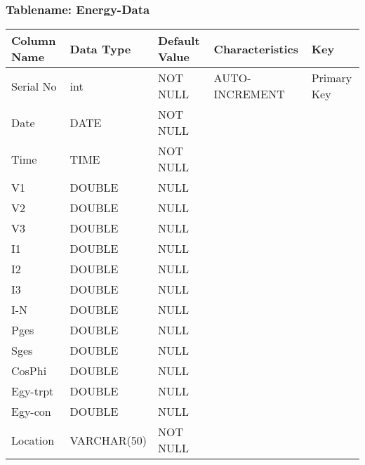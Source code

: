 \subsubsection*{Tablename:    Energy-Data} 
\begin{center}
    \begin{tabular}{ | l | l | l | l | l |}
    \hline
    \textbf{Column Name} & \textbf{Data Type} & \textbf{Default Value} & \textbf{Characteristics} & \textbf{Key} \\ \hline
    Serial No & int & NOT NULL & AUTO-INCREMENT & Primary Key\\ \hline
    Date & DATE & NOT NULL &  & \\ \hline
    Time & TIME & NOT NULL & & \\ \hline
    V1 & DOUBLE & NULL & & \\ \hline
    V2 & DOUBLE & NULL & & \\ \hline
    V3 & DOUBLE & NULL & & \\ \hline
    I1 & DOUBLE & NULL & & \\ \hline
    I2 & DOUBLE & NULL & & \\ \hline
    I3 & DOUBLE & NULL & & \\ \hline    
    I-N & DOUBLE & NULL & & \\ \hline
    Pges & DOUBLE & NULL & & \\ \hline
    Sges & DOUBLE & NULL & & \\ \hline
    CosPhi & DOUBLE & NULL & & \\ \hline
    Egy-trpt & DOUBLE & NULL & & \\ \hline
    Egy-con & DOUBLE & NULL & & \\ \hline
    Location & VARCHAR(50) & NOT NULL & & \\
    \hline
    \end{tabular}
\end{center}

